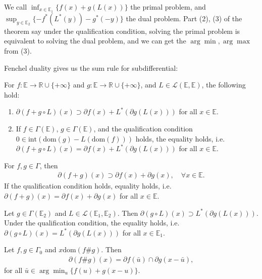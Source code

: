 \documentclass{tufte-handout}
\begin{document}
We call \( \inf_{x \in \mathbb{E}_1} \{f(x) + g(L(x))\} \) the primal problem, and \( \sup_{y \in \mathbb{E}_2} \{-f^*(L^*(y)) - g^*(-y)\} \) the dual problem.
Part (2), (3) of the theorem say under the qualification condition, 
solving the primal problem is equivalent to solving the dual problem, and we can get the 
\(\arg\min, \arg\max\) from (3).

Fenchel duality gives us the sum rule for subdifferential:
\begin{Theorem}
    For \( f: \mathbb{E} \to \mathbb{R}\cup \{+\infty\} \) and \( g: \mathbb{E} \to \mathbb{R}\cup \{+\infty\} \), 
    and \( L \in \mathcal{L}(\mathbb{E}, \mathbb{E}) \), the following hold:
    \begin{enumerate}
        \item \( \partial (f + g\circ L)(x) \supset \partial f(x) + L^*(\partial g(L(x))) \) for all \( x \in \mathbb{E} \).
        \item If \( f\in \Gamma(\mathbb{E}) \), \( g \in \Gamma(\mathbb{E}) \), and 
        the qualification condition \( 0 \in \text{int}(\text{dom}(g) - L(\text{dom}(f))) \) holds, 
        the equality holds, i.e. \( \partial (f + g\circ L)(x) = \partial f(x) + L^*(\partial g(L(x))) \) for all \( x \in \mathbb{E} \).
    \end{enumerate}
\end{Theorem}

\begin{Corollary}
    For \( f, g \in \Gamma\), then 
    \begin{align}
        \partial (f + g)(x) \supset \partial f(x) + \partial g(x), \quad \forall x \in \mathbb{E}.
    \end{align}
    If the qualification condition holds, equality holds, i.e. \( \partial (f + g)(x) = \partial f(x) + \partial g(x) \) for all \( x \in \mathbb{E} \).
\end{Corollary}

\begin{Corollary}
    Let \( g\in \Gamma(\mathbb{E}_2) \) and \( L \in \mathcal{L}(\mathbb{E}_1, \mathbb{E}_2) \).
    Then \( \partial (g\circ L)(x) \supset L^*(\partial g(L(x))) \). Under the 
    qualification condition, the equality holds, i.e. \( \partial (g\circ L)(x) = L^*(\partial g(L(x))) \) for all \( x \in \mathbb{E}_1 \).
\end{Corollary}

\begin{Theorem}
    Let \( f, g \in \Gamma_0\) and \( x \text{dom}(f \# g)\). Then 
    \begin{align}
        \partial (f \# g)(x) = \partial f(\bar u) \cap \partial g(x - \bar u),
    \end{align}
    for all \( \bar u \in \arg\min_u \{f(u) + g(x-u)\} \).
\end{Theorem}
\end{document}
